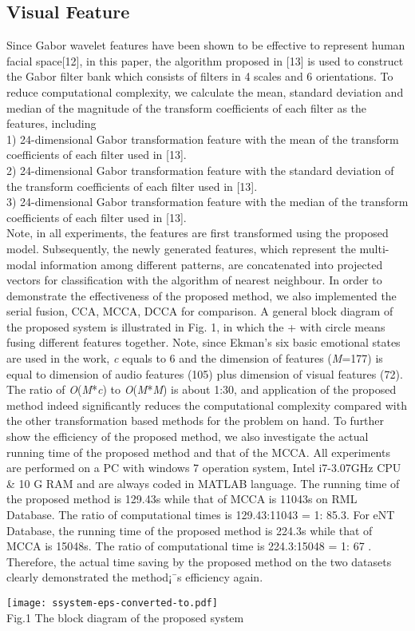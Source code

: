 \documentclass[10pt,journal,compsoc]{IEEEtran}
\begin{document}
\subsection{Visual Feature}
Since Gabor wavelet features have been shown to be effective to represent human facial space[12], in this paper, the algorithm proposed in [13] is used to construct the Gabor filter bank which consists of
filters in 4 scales and 6 orientations. To reduce computational complexity, we calculate the mean, standard deviation and median of the magnitude of the transform coefficients of each filter as the features, including\\
1) 24-dimensional Gabor transformation feature with the mean of the transform coefficients of each filter used in [13].\\
2) 24-dimensional Gabor transformation feature with the standard deviation of the transform coefficients of each filter used in [13].\\
3) 24-dimensional Gabor transformation feature with the median of the transform coefficients of each filter used in [13].\\\indent
Note, in all experiments, the features are first transformed using the proposed model. Subsequently, the newly generated features, which represent the multi-modal information among different patterns, are concatenated into projected vectors for classification with the algorithm of nearest neighbour. In order to demonstrate the effectiveness of the proposed method, we also implemented the serial fusion, CCA, MCCA, DCCA for comparison. A general block diagram of the proposed system is illustrated in Fig. 1, in which the + with circle means fusing different features together. Note, since Ekman's six basic emotional states are used in the work, \emph{c} equals to 6 and the dimension of features (\emph{M}=177) is equal to dimension of audio features (105) plus dimension of visual features (72). The ratio of \emph{O}(\emph{M}*\emph{c}) to \emph{O}(\emph{M}*\emph{M}) is about 1:30, and application of the proposed method indeed significantly reduces the computational complexity compared with the other transformation based methods for the problem on hand. To further show the efficiency of the proposed method, we also investigate the actual running time of the proposed method and that of the MCCA. All experiments are performed on a PC with windows 7 operation system, Intel i7-3.07GHz CPU \& 10 G RAM and are always coded in MATLAB language. The running time of the proposed method is 129.43s while that of MCCA is 11043s on RML Database. The ratio of computational times is 129.43:11043 = 1: 85.3. For eNT Database, the running time of the proposed method is 224.3s while that of MCCA is 15048s. The ratio of computational time is 224.3:15048 = 1: 67 . Therefore, the actual time saving by the proposed method on the two datasets clearly demonstrated the method¡¯s efficiency again.
\begin{figure*}[t]
\centering
\texttt{[image: ssystem-eps-converted-to.pdf]}\\ Fig.1 The block diagram of the proposed system\\
\end{figure*}
\end{document}
